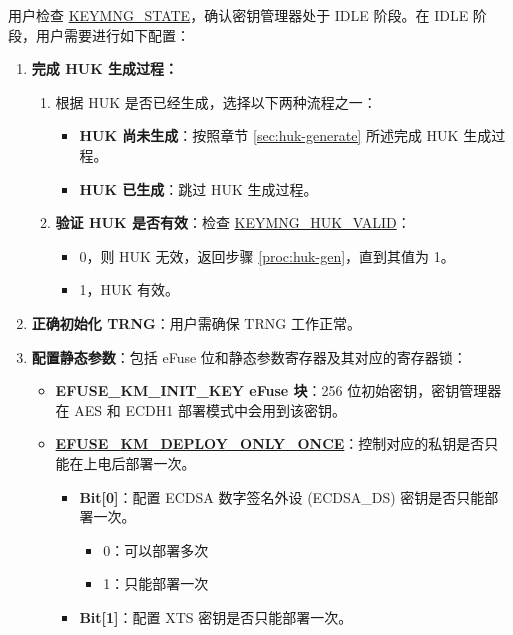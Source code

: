 \documentclass[main\_\_CN.tex]{subfiles}
\begin{document}
用户检查 \hyperref[fielddesc:KEYMNGSTATE]{KEYMNG\_STATE}，确认密钥管理器处于 IDLE 阶段。在 IDLE 阶段，用户需要进行如下配置：
\begin{enumerate}
    \item \textbf{完成 HUK 生成过程：}
    \begin{enumerate}
        \item 根据 HUK 是否已经生成，选择以下两种流程之一：
        \label{proc:huk-gen}
        \begin{itemize}
            \item \textbf{HUK 尚未生成}：按照章节 \ref{sec:huk-generate} 所述完成 HUK 生成过程。
            \item \textbf{HUK 已生成}：跳过 HUK 生成过程。
        \end{itemize}
        \item \textbf{验证 HUK 是否有效}：检查 \hyperref[fielddesc:KEYMNGHUKVALID]{KEYMNG\_HUK\_VALID}：
        \begin{itemize}
            \item 0，则 HUK 无效，返回步骤 \ref{proc:huk-gen}，直到其值为 1。
            \item 1，HUK 有效。
        \end{itemize}
    \end{enumerate}
    \item \textbf{正确初始化 TRNG}：用户需确保 TRNG 工作正常。
    \item \textbf{配置静态参数}：包括 eFuse 位和静态参数寄存器及其对应的寄存器锁：
    \begin{itemize}
        \item \textbf{EFUSE\_KM\_INIT\_KEY eFuse 块}：256 位初始密钥，密钥管理器在 AES 和 ECDH1 部署模式中会用到该密钥。
        \item \textbf{\hyperref[fielddesc:EFUSEKMDEPLOYONLYONCE]{EFUSE\_KM\_DEPLOY\_ONLY\_ONCE}}：控制对应的私钥是否只能在上电后部署一次。
        \begin{itemize}
            \item \textbf{Bit[0]}：配置 ECDSA 数字签名外设 (ECDSA\_DS) 密钥是否只能部署一次。
            \begin{itemize}
                \item 0：可以部署多次
                \item 1：只能部署一次
            \end{itemize}
            \item \textbf{Bit[1]}：配置 XTS 密钥是否只能部署一次。
            \begin{itemize}

\end{itemize}
\end{itemize}
\end{itemize}
\end{enumerate}
\end{document}
